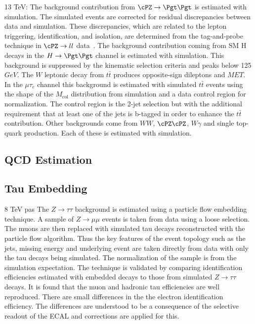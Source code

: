 13 TeV:
The background contribution from $\cPZ \rightarrow \Pgt\Pgt$ is estimated with simulation. The simulated events are corrected for residual discrepancies between data and simulation. These discrepancies, which are related to the lepton triggering, identification, and isolation, are determined from the tag-and-probe technique in $\cPZ \rightarrow ll$ data~\cite{Chatrchyan:2012xi, Khachatryan:2015hwa}. The background contribution coming from SM H decays in the $H \rightarrow \Pgt\Pgt$ channel is
estimated with simulation. This background is suppressed by the kinematic selection criteria
and peaks below 125 $GeV$. The $W$ leptonic decay from  $t\bar{t}$ produces opposite-sign dileptons and $MET$. In the $\mu \tau_{e}$ channel this background is estimated with simulated $t\bar{t}$
events using the shape of the $M_\text{col}$ distribution from simulation and a data control region for
normalization. The control region is the  2-jet selection but with the additional requirement that
at least one of the jets is b-tagged in order to enhance the $t\bar{t}$ contribution.
Other backgrounds come from $WW$, $\cPZ\cPZ$, $W\gamma$ and single
top-quark production. Each of these is estimated with simulation.
\subsection{QCD Estimation}
\subsection{Tau Embedding}
8 TeV pas
The  $Z \rightarrow \tau \tau$  background is estimated using a particle flow embedding technique.
A sample of $Z \rightarrow \mu \mu$ events is taken from data using a loose selection. The muons are then replaced
with simulated tau decays reconstructed with the particle flow algorithm. Thus the key features of the event topology such as the
jets, missing energy and underlying event are taken directly from data with only the tau decays being simulated. The normalization
of the sample is from the simulation expectation. The technique is validated by comparing identification efficiencies
estimated with embedded decays to those from  simulated $Z \rightarrow \tau \tau$ decays. It is found that the muon and hadronic
tau efficiencies are well reproduced. There are small differences in the the electron identification efficiency.
 The differences are
understood to be a consequence of
the selective readout of the ECAL and corrections are applied for this.
